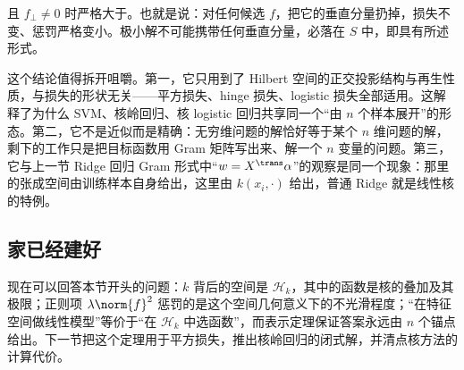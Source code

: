 且 \(f_{\perp}\ne0\) 时严格大于。也就是说：对任何候选 \(f\)，把它的垂直分量扔掉，损失不变、惩罚严格变小。极小解不可能携带任何垂直分量，必落在 \(S\) 中，即具有所述形式。

这个结论值得拆开咀嚼。第一，它只用到了 Hilbert 空间的正交投影结构与再生性质，与损失的形状无关——平方损失、hinge 损失、logistic 损失全部适用。这解释了为什么 SVM、核岭回归、核 logistic 回归共享同一个``由 \(n\) 个样本展开''的形态。第二，它不是近似而是精确：无穷维问题的解恰好等于某个 \(n\) 维问题的解，剩下的工作只是把目标函数用 Gram 矩阵写出来、解一个 \(n\) 变量的问题。第三，它与上一节 Ridge 回归 Gram 形式中``\(w=X^{\trans}\alpha\)''的观察是同一个现象：那里的张成空间由训练样本自身给出，这里由 \(k(x_i,\cdot)\) 给出，普通 Ridge 就是线性核的特例。

\subsection{家已经建好}

现在可以回答本节开头的问题：\(k\) 背后的空间是 \(\mathcal{H}_k\)，其中的函数是核的叠加及其极限；正则项 \(\lambda\norm{f}^{2}\) 惩罚的是这个空间几何意义下的不光滑程度；``在特征空间做线性模型''等价于``在 \(\mathcal{H}_k\) 中选函数''，而表示定理保证答案永远由 \(n\) 个锚点给出。下一节把这个定理用于平方损失，推出核岭回归的闭式解，并清点核方法的计算代价。
